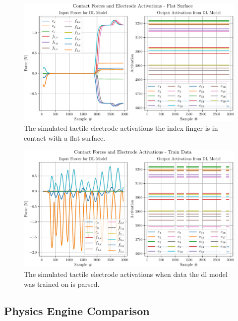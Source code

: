 \begin{figure}[!h]
	\begin{center}
		\includegraphics[width=\textwidth]{chapters/1-tactile-perception/fig/matplotlib/flat-contact-graph.pdf}
	\end{center}
	\caption{The simulated tactile electrode activations the index finger is in contact with a flat surface.}
	\label{fig:flat-contact-graph}
\end{figure}
\begin{figure}[!h]
	\begin{center}
		\includegraphics[width=\textwidth]{chapters/1-tactile-perception/fig/matplotlib/train-contact-graph.pdf}
	\end{center}
	\caption{The simulated tactile electrode activations when data the \gls{dl} model was trained on is parsed.}
	\label{fig:train-contact-graph}
\end{figure}

\subsection{Physics Engine Comparison}\label{sec:1-tactile-perception-results-gazebo-comparison}

